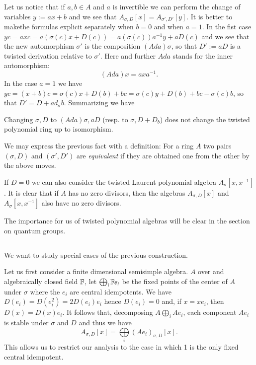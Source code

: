 Let us notice that if $a,b\in A$ and $a$ is invertible we can perform the change of variables $y:=ax+b$ and we see that $A_{\sigma, D}[x]=A_{\sigma', D'}[y]$. It is better to make\pageoriginale the formulas explicit separately when $b=0$ and when $a=1$. In the fist case $yc=axc=a(\sigma(c)x+ D(c)) =a(\sigma(c))a^{-1}y+aD(c)$ and we see that the new automorphism $\sigma'$ is the composition $(Ada)\sigma$, so that $D' :=aD$ is a twisted derivation relative to $\sigma'$. Here and further $Ada$ stands for the inner automorphism:
$$
(Ada)x = axa^{-1}.
$$
In the case $a=1$ we have $yc=(x+b)c =\sigma(c)x+ D(b)+bc =\sigma(c)y+D(b)+bc-\sigma(c)b$, so that $D'=D+ad_{\sigma}b$. Summarizing we have

\begin{prop*}
Changing $\sigma, D$ to $(Ada)\sigma, aD$ (resp. to $\sigma, D+D_{b}$) does not change the twisted polynomial ring up to isomorphism.
\end{prop*}

We may express the previous fact with a definition: For a ring $A$ two pairs $(\sigma, D)$ and $(\sigma', D')$ are \textit{equivalent} if they are obtained one from the other by the above moves.

If $D=0$ we can also consider the twisted Laurent polynomial algebra $A_{\sigma}[x, x^{-1}]$. It is clear that if $A$ has no zero divisors, then the algebras $A_{\sigma, D}[x]$ and  $A_{\sigma}[x, x^{-1}]$ also have no zero divisors.

The importance for us of twisted polynomial algebras will be clear in the section on quantum groups.

\subsection{}\label{chap4-subsec-1.3}
We want to study special cases of the previous construction.

Let us first consider a finite dimensional semisimple algebra. $A$ over and algebraically closed field $\mathbb{F}$, let
$\bigoplus_{i}\mathbb{F} e_{i}$ be the fixed points of the center of $A$ under $\sigma$ where the $e_{i}$ are central idempotents. We have $D(e_{i}) =D(e_{i}^{2}) =2D(e_{i})e_{i}$ hence $D(e_{i}) = 0$ and, if $x=xe_{i}$, then $D(x)=D(x)e_{i}$. It follows that, decomposing $A \bigoplus_{i}Ae_{i}$, each component $Ae_{i}$ is stable under $\sigma$ and $D$ and thus we have
$$
A_{\sigma, D}[x]= \bigoplus\limits_{i}(Ae_{i})_{\sigma,D}[x].
$$ 
This allows us to restrict our analysis to the case in which 1 is the only fixed central idempotent.

